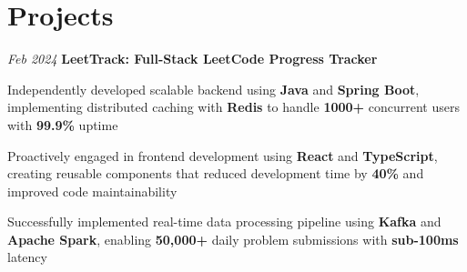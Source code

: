 \section{Projects}

\begin{twocolentry}{
    \textit{Feb 2024}
}{
    \textbf{LeetTrack: Full-Stack LeetCode Progress Tracker}
}
\end{twocolentry}
\begin{onecolentry}
    \begin{highlights}
        \item Independently developed scalable backend using \textbf{Java} and \textbf{Spring Boot}, implementing distributed caching with \textbf{Redis} to handle \textbf{1000+} concurrent users with \textbf{99.9\%} uptime
        \item Proactively engaged in frontend development using \textbf{React} and \textbf{TypeScript}, creating reusable components that reduced development time by \textbf{40\%} and improved code maintainability
        \item Successfully implemented real-time data processing pipeline using \textbf{Kafka} and \textbf{Apache Spark}, enabling \textbf{50,000+} daily problem submissions with \textbf{sub-100ms} latency
    \end{highlights}
\end{onecolentry}
